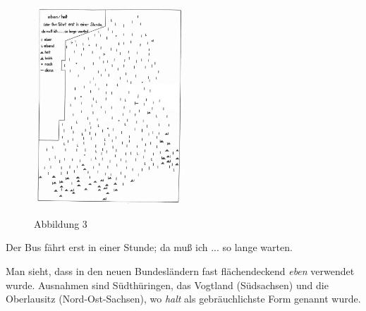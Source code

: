 \begin{figure}[h]
\includegraphics[width=0.5\textwidth]{he3.png}
\caption{Abbildung 3}
\label{Abbildung 3}
\hbox{}\hfill\hbox{\citet[266]{Protze1997}}
\end{figure}

\begin{exe}
	\ex\label{539} 
    Der Bus fährt erst in einer Stunde; da muß ich ... so lange warten. 
    \newline		
	\hbox{}\hfill\hbox{\citet[167]{Protze1997}}    
\end{exe}
Man sieht, dass in den neuen Bundesländern fast flächendeckend \textit{eben} verwendet wurde. Ausnahmen sind Südthüringen, das Vogtland (Südsachsen) und die Oberlausitz (Nord-Ost-Sachsen), wo \textit{halt} als gebräuchlichste Form genannt wurde.

